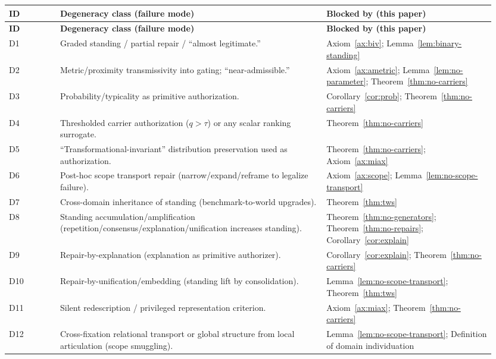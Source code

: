 \documentclass[12pt]{article}
\begin{document}
\setlength{\LTpre}{0pt}
\setlength{\LTpost}{0pt}
\begin{longtable}{>{\raggedright\arraybackslash}p{0.10\linewidth} >{\raggedright\arraybackslash}p{0.52\linewidth} >{\raggedright\arraybackslash}p{0.33\linewidth}}
\toprule
\textbf{ID} & \textbf{Degeneracy class (failure mode)} & \textbf{Blocked by (this paper)} \\
\midrule
\endfirsthead
\toprule
\textbf{ID} & \textbf{Degeneracy class (failure mode)} & \textbf{Blocked by (this paper)} \\
\midrule
\endhead

D1 & Graded standing / partial repair / ``almost legitimate.'' & Axiom~\ref{ax:biv}; Lemma~\ref{lem:binary-standing} \\
D2 & Metric/proximity transmissivity into gating; ``near-admissible.'' & Axiom~\ref{ax:ametric}; Lemma~\ref{lem:no-parameter}; Theorem~\ref{thm:no-carriers} \\
D3 & Probability/typicality as primitive authorization. & Corollary~\ref{cor:prob}; Theorem~\ref{thm:no-carriers} \\
D4 & Thresholded carrier authorization ($q>\tau$) or any scalar ranking surrogate. & Theorem~\ref{thm:no-carriers} \\
D5 & ``Transformational-invariant'' distribution preservation used as authorization. & Theorem~\ref{thm:no-carriers}; Axiom~\ref{ax:miax} \\
D6 & Post-hoc scope transport repair (narrow/expand/reframe to legalize failure). & Axiom~\ref{ax:scope}; Lemma~\ref{lem:no-scope-transport} \\
D7 & Cross-domain inheritance of standing (benchmark-to-world upgrades). & Theorem~\ref{thm:tws} \\
D8 & Standing accumulation/amplification (repetition/consensus/explanation/unification increases standing). & Theorem~\ref{thm:no-generators}; Theorem~\ref{thm:no-repairs}; Corollary~\ref{cor:explain} \\
D9 & Repair-by-explanation (explanation as primitive authorizer). & Corollary~\ref{cor:explain}; Theorem~\ref{thm:no-carriers} \\
D10 & Repair-by-unification/embedding (standing lift by consolidation). & Lemma~\ref{lem:no-scope-transport}; Theorem~\ref{thm:tws} \\
D11 & Silent redescription / privileged representation criterion. & Axiom~\ref{ax:miax}; Theorem~\ref{thm:no-carriers} \\
D12 & Cross-fixation relational transport or global structure from local articulation (scope smuggling). & Lemma~\ref{lem:no-scope-transport}; Definition of domain individuation \\

\end{longtable}
\end{document}
